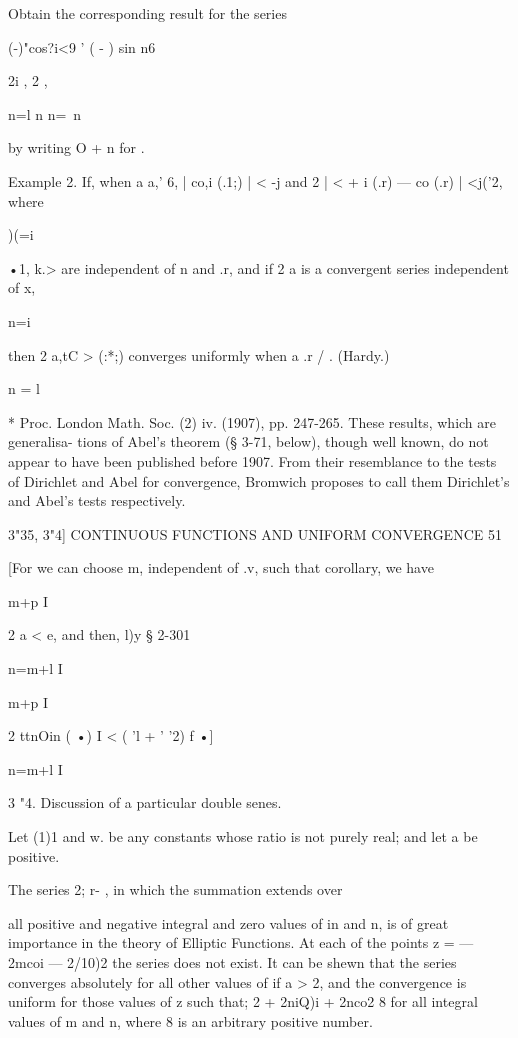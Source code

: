 Obtain the corresponding result for the series

  (-)"cos?i<9 ' ( - ) sin n6

2i , 2 ,

n=l n n=\ n

by writing O + n for .

Example 2. If, when a a,' 6, | co,i (.1;) | < -j and 2 | < + i (.r) —
co (.r) | <j('2, where

)(=i

 •1, k.> are independent of n and .r, and if 2 a is a convergent
series independent of x,

n=i

then 2 a,tC > (:*;) converges uniformly when a .r / . (Hardy.)

n = l

* Proc. London Math. Soc. (2) iv. (1907), pp. 247-265. These results,
which are generalisa- tions of Abel's theorem (§ 3-71, below), though
well known, do not appear to have been published before 1907. From
their resemblance to the tests of Dirichlet and Abel for convergence,
Bromwich proposes to call them Dirichlet's and Abel's tests
respectively.



3"35, 3"4] CONTINUOUS FUNCTIONS AND UNIFORM CONVERGENCE 51

[For we can choose m, independent of .v, such that corollary, we have



m+p I

2 a < e, and then, l)y § 2-301

n=m+l I



m+p I

2 ttnOin ( •) I < ( 'l + ' '2) f •]



n=m+l I

3 "4. Discussion of a particular double senes.

Let (1)1 and w. be any constants whose ratio is not purely real; and
let a be positive.

The series 2; r- , in which the summation extends over

all positive and negative integral and zero values of in and n, is of
great importance in the theory of Elliptic Functions. At each of the
points z = — 2mcoi — 2/10)2 the series does not exist. It can be shewn
that the series converges absolutely for all other values of if a > 2,
and the convergence is uniform for those values of z such that; 2 +
2niQ)i + 2nco2 8 for all integral values of m and n, where 8 is an
arbitrary positive number.

